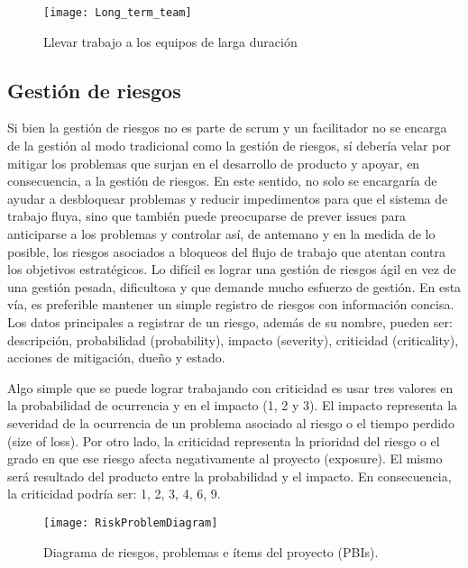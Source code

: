 \begin{figure}[h]
  \centering
  \texttt{[image: Long\_term\_team]}
  \caption{Llevar trabajo a los equipos de larga duración}
  \centering
  \label{fig:Long_term_team} %
\end{figure}
\FloatBarrier %

\subsection{Gestión de riesgos}

Si bien la gestión de riesgos no es parte de scrum y un facilitador no se encarga de la gestión al modo tradicional como la gestión de riesgos, sí debería velar por mitigar los problemas que surjan en el desarrollo de producto y apoyar, en consecuencia, a la gestión de riesgos. En este sentido, no solo se encargaría de ayudar a desbloquear problemas y reducir impedimentos para que el sistema de trabajo fluya, sino que también puede preocuparse de prever issues para anticiparse a los problemas y controlar así, de antemano y en la medida de lo posible, los riesgos asociados a bloqueos del flujo de trabajo que atentan contra los objetivos estratégicos. Lo difícil es lograr una gestión de riesgos ágil en vez de una gestión pesada, dificultosa y que demande mucho esfuerzo de gestión. En esta vía, es preferible mantener un simple registro de riesgos con información concisa. Los datos principales a registrar de un riesgo, además de su nombre, pueden ser: descripción, probabilidad (probability), impacto (severity), criticidad (criticality), acciones de mitigación, dueño y estado.

Algo simple que se puede lograr trabajando con criticidad es usar tres valores en la probabilidad de ocurrencia y en el impacto (1, 2 y 3). El impacto representa la severidad de la ocurrencia de un problema asociado al riesgo o el tiempo perdido (size of loss). Por otro lado, la criticidad representa la prioridad del riesgo o el grado en que ese riesgo afecta negativamente al proyecto (exposure). El mismo será resultado del producto entre la probabilidad y el impacto. En consecuencia, la criticidad podría ser: 1, 2, 3, 4, 6, 9.

\begin{figure}[h]
  \centering
  \texttt{[image: RiskProblemDiagram]}
  \caption{Diagrama de riesgos, problemas e ítems del proyecto (PBIs).}
  \centering
  \label{fig:RiskProblemDiagram} %
\end{figure}
\FloatBarrier %

